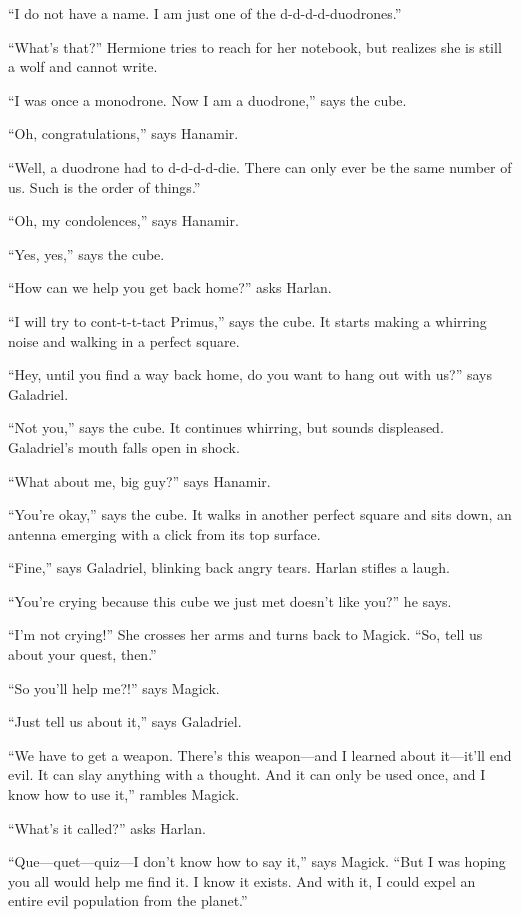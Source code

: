 \documentclass[smalldemyvopaper,11pt,twoside,onecolumn,openright,extrafontsizes]{memoir}
\begin{document}
``I do not have a name. I am just one of the d-d-d-d-duodrones.''

``What's that?'' Hermione tries to reach for her notebook, but realizes
she is still a wolf and cannot write.

``I was once a monodrone. Now I am a duodrone,'' says the cube.

``Oh, congratulations,'' says Hanamir.

``Well, a duodrone had to d-d-d-d-die. There can only ever be the same
number of us. Such is the order of things.''

``Oh, my condolences,'' says Hanamir.

``Yes, yes,'' says the cube.

``How can we help you get back home?'' asks Harlan.

``I will try to cont-t-t-tact Primus,'' says the cube. It starts making
a whirring noise and walking in a perfect square.

``Hey, until you find a way back home, do you want to hang out with
us?'' says Galadriel.

``Not you,'' says the cube. It continues whirring, but sounds
displeased. Galadriel's mouth falls open in shock.

``What about me, big guy?'' says Hanamir.

``You're okay,'' says the cube. It walks in another perfect square and
sits down, an antenna emerging with a click from its top surface.

``Fine,'' says Galadriel, blinking back angry tears. Harlan stifles a
laugh.

``You're crying because this cube we just met doesn't like you?'' he
says.

``I'm not crying!'' She crosses her arms and turns back to Magick. ``So,
tell us about your quest, then.''

``So you'll help me?!'' says Magick.

``Just tell us about it,'' says Galadriel.

``We have to get a weapon. There's this weapon---and I learned about
it---it'll end evil. It can slay anything with a thought. And it can
only be used once, and I know how to use it,'' rambles Magick.

``What's it called?'' asks Harlan.

``Que---quet---quiz---I don't know how to say it,'' says Magick. ``But I
was hoping you all would help me find it. I know it exists. And with it,
I could expel an entire evil population from the planet.''
\end{document}
